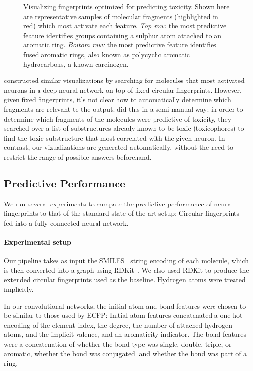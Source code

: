 \documentclass{article}
\begin{document}
\begin{figure}[h]
\begin{tabular}{>{\centering}m{1in} >{\centering}m{3.1cm} >{\centering}m{3.3cm} >{\centering\arraybackslash}m{3.1cm}}
\end{tabular}
\vspace{-3mm}
\caption{Visualizing fingerprints optimized for predicting toxicity.
Shown here are representative samples of molecular fragments (highlighted in red) which most activate each feature.
\emph{Top row:} the most predictive feature identifies groups containing a sulphur atom attached to an aromatic ring.
\emph{Bottom row:} the most predictive feature identifies fused aromatic rings, also known as polycyclic aromatic hydrocarbons, a known carcinogen.
}
\label{fig:learned features toxicity}
\end{figure}

\citet{unterthiner2015toxicity} constructed similar visualizations by searching for molecules that most activated neurons in a deep neural network on top of fixed circular fingerprints.
However, given fixed fingerprints, it's not clear how to automatically determine which fragments are relevant to the output.
\citet{unterthiner2015toxicity} did this in a semi-manual way: in order to determine which fragments of the molecules were predictive of toxicity, they searched over a list of substructures already known to be toxic (toxicophores) to find the toxic substructure that most correlated with the given neuron.
In contrast, our vizualizations are generated automatically, without the need to restrict the range of possible answers beforehand.

\subsection{Predictive Performance}

We ran several experiments to compare the predictive performance of neural fingerprints to that of the standard state-of-the-art setup:  Circular fingerprints fed into a fully-connected neural network.

\paragraph{Experimental setup}
Our pipeline takes as input the SMILES~\citep{weininger1988smiles} string encoding of each molecule, which is then converted into a graph using RDKit~\citep{rdkit}.
We also used RDKit to produce the extended circular fingerprints used as the baseline.
Hydrogen atoms were treated implicitly.

In our convolutional networks, the initial atom and bond features were chosen to be similar to those used by ECFP:
Initial atom features concatenated a one-hot encoding of the element index, the degree, the number of attached hydrogen atoms, and the implicit valence, and an aromaticity indicator.
The bond features were a concatenation of whether the bond type was single, double, triple, or aromatic, whether the bond was conjugated, and whether the bond was part of a ring.
\end{document}
